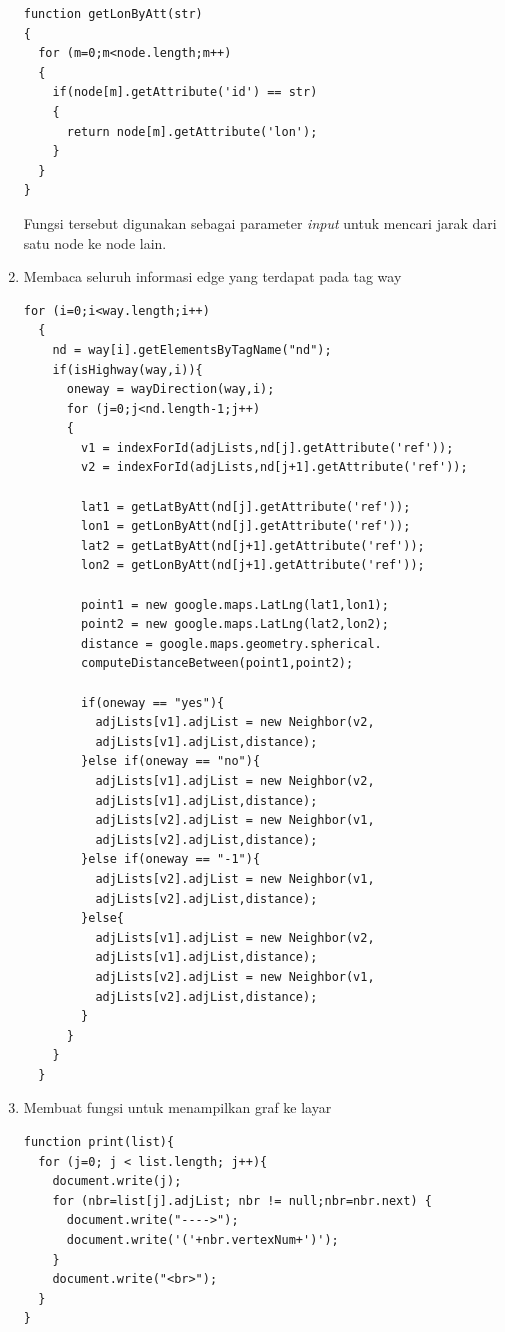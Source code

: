 \begin{enumerate}
\begin{verbatim}
function getLonByAtt(str)
{
  for (m=0;m<node.length;m++)
  {
    if(node[m].getAttribute('id') == str)
    {
      return node[m].getAttribute('lon');
    }
  }
}
\end{verbatim}
  Fungsi tersebut digunakan sebagai parameter \textit{input} untuk mencari jarak
  dari satu node ke node lain.

  \item Membaca seluruh informasi edge yang terdapat pada tag way
\begin{verbatim}
for (i=0;i<way.length;i++)
  {
    nd = way[i].getElementsByTagName("nd");
    if(isHighway(way,i)){
      oneway = wayDirection(way,i);
      for (j=0;j<nd.length-1;j++)
      {
        v1 = indexForId(adjLists,nd[j].getAttribute('ref'));
        v2 = indexForId(adjLists,nd[j+1].getAttribute('ref'));
				
        lat1 = getLatByAtt(nd[j].getAttribute('ref'));
        lon1 = getLonByAtt(nd[j].getAttribute('ref'));
        lat2 = getLatByAtt(nd[j+1].getAttribute('ref'));
        lon2 = getLonByAtt(nd[j+1].getAttribute('ref'));
	
        point1 = new google.maps.LatLng(lat1,lon1);
        point2 = new google.maps.LatLng(lat2,lon2);
        distance = google.maps.geometry.spherical.
        computeDistanceBetween(point1,point2);
				
        if(oneway == "yes"){
          adjLists[v1].adjList = new Neighbor(v2,
          adjLists[v1].adjList,distance); 
        }else if(oneway == "no"){
          adjLists[v1].adjList = new Neighbor(v2,
          adjLists[v1].adjList,distance); 
          adjLists[v2].adjList = new Neighbor(v1,
          adjLists[v2].adjList,distance);
        }else if(oneway == "-1"){
          adjLists[v2].adjList = new Neighbor(v1,
          adjLists[v2].adjList,distance); 
        }else{
          adjLists[v1].adjList = new Neighbor(v2,
          adjLists[v1].adjList,distance); 
          adjLists[v2].adjList = new Neighbor(v1,
          adjLists[v2].adjList,distance); 
        }	
      }
    }
  }
\end{verbatim}

  \item Membuat fungsi untuk menampilkan graf ke layar
\begin{verbatim}
function print(list){
  for (j=0; j < list.length; j++){
    document.write(j);
    for (nbr=list[j].adjList; nbr != null;nbr=nbr.next) {
      document.write("---->");
      document.write('('+nbr.vertexNum+')');
    }
    document.write("<br>");
  }
}
\end{verbatim}
\end{enumerate}
